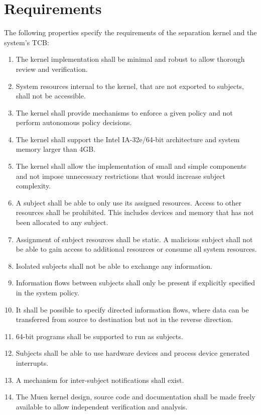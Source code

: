 \section{Requirements}\label{sec:requirements}

The following properties specify the requirements of the separation kernel and
the system's TCB:
\begin{enumerate}
	\item The kernel implementation shall be minimal and robust to allow
		thorough review and verification.
	\item System resources internal to the kernel, that are not exported to
		subjects, shall not be accessible.
	\item The kernel shall provide mechanisms to enforce a given policy and not
		perform autonomous policy decisions.
	\item The kernel shall support the Intel IA-32e/64-bit architecture and
		system memory larger than 4GB.
	\item The kernel shall allow the implementation of small and simple
		components and not impose unnecessary restrictions that would increase
		subject complexity.
	\item A subject shall be able to only use its assigned resources. Access to
		other resources shall be prohibited. This includes devices and memory
		that has not been allocated to any subject.
	\item Assignment of subject resources shall be static. A malicious subject
		shall not be able to gain access to additional resources or consume all
		system resources.
	\item Isolated subjects shall not be able to exchange any information.
	\item Information flows between subjects shall only be present if explicitly
		specified in the system policy.
	\item It shall be possible to specify directed information flows, where data
		can be transferred from source to destination but not in the reverse
		direction.
	\item 64-bit programs shall be supported to run as subjects.
	\item Subjects shall be able to use hardware devices and process device
		generated interrupts.
	\item A mechanism for inter-subject notifications shall exist.
	\item The Muen kernel design, source code and documentation shall be made
		freely available to allow independent verification and analysis.
\end{enumerate}
